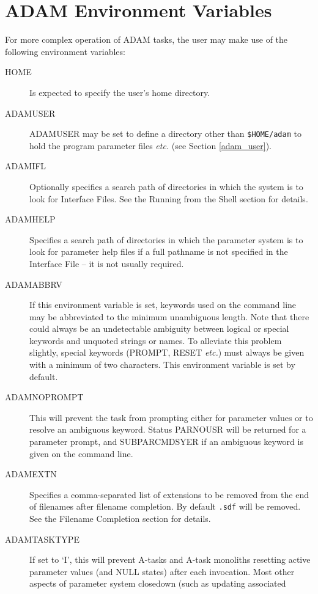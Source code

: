 \documentclass[twoside,11pt]{article}
\newcommand{\htmlref}[2]{#1}
\newcommand{\xlabel}[1]{}
\renewcommand{\_}{\texttt{\symbol{95}}}
\begin{document}
\newpage
\section{\xlabel{ADAM_environment_variables}\label{envars}ADAM Environment Variables}
For more complex operation of ADAM tasks, the user may make use of the following
environment variables:
\begin{description}
\item[HOME] Is expected to specify the user's home directory.
\item[ADAM\_USER] 
ADAM\_USER may be set to define a directory other than \texttt{\$HOME/adam}
to hold the program parameter files \textit{etc.} (see Section \ref{adam_user}).
\item[ADAM\_IFL] Optionally specifies a search path of directories in 
which the system is to look for Interface Files. 
See the 
\htmlref{Running from the Shell}{running_from_the_shell}
section for details.
\item[ADAM\_HELP] Specifies a search path of 
directories in which the parameter system is to look for parameter help files 
if a full pathname is not specified in the Interface File -- it is not 
usually required.
\item[ADAM\_ABBRV] 
If this environment variable is set, keywords used on the
command line may be abbreviated to the minimum unambiguous length.
Note that there could always be an undetectable ambiguity between logical or
special keywords and unquoted strings or names. To alleviate this problem
slightly, special keywords (PROMPT, RESET \textit{etc.}) must always be given
with a minimum of two characters. This environment variable is set by default.
\item[ADAM\_NOPROMPT] This will prevent the task from prompting either for
parameter values or to resolve an ambiguous keyword. Status PAR\_\_NOUSR will
be returned for a parameter prompt, and SUBPAR\_\_CMDSYER if an ambiguous
keyword is given on the command line.
\item[ADAM\_EXTN]
Specifies a comma-separated list of extensions to be removed from the end
of filenames after filename completion. By default \texttt{.sdf} will be
removed.
See the 
\htmlref{Filename Completion}{filename_completion}
section for details.
\item[ADAM\_TASK\_TYPE] 
If set to `I', this will prevent A-tasks and A-task monoliths
resetting active parameter values (and NULL states) after each invocation. 
Most other aspects of parameter system closedown (such as updating associated 

\end{description}
\end{document}

